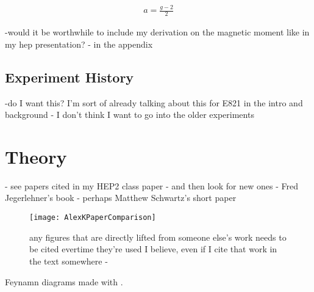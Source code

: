 		\begin{align}
            a = \frac{g-2}{2}
        \label{eq:anamoly}
		\end{align}


-would it be worthwhile to include my derivation on the magnetic moment like in my hep presentation? - in the appendix



\subsection{Experiment History}
\label{subsec:ExperimentHistory}

-do I want this? I'm sort of already talking about this for E821 in the intro and background - I don't think I want to go into the older experiments



\section{Theory}
\label{sec:Theory}

- see papers cited in my HEP2 class paper - and then look for new ones
- Fred Jegerlehner's book
- perhaps Matthew Schwartz's short paper 



\begin{figure}[]
	\centering
	\texttt{[image: AlexKPaperComparison]}
	\caption[AlexKPaperComparison]{any figures that are directly lifted from someone else's work needs to be cited evertime they're used I believe, even if I cite that work in the text somewhere - \cite{Keshavarzi:2018mgv} }
	\label{fig:AlexKPaperComparison}
\end{figure}

Feynamn diagrams made with \cite{tikz-feynman,tikz-feynhand}.

